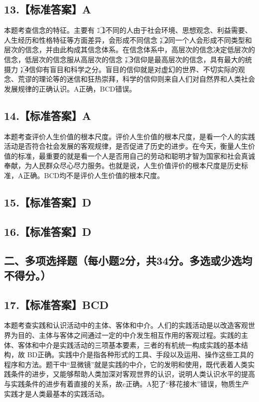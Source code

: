 \documentclass[UTF8,11pt]{ctexart}
\begin{document}
\subsection*{13.【标准答案】A}

本题考查信念的特征。主要有：\textcircled{1}不同的人由于社会环境、思想观念、利益需要、人生经历和性格特征等方面差异，会形成不同信念；\textcircled{2}同一个人会形成不同类型和层次的信念，并由此构成其信念体系。在信念体系中，高层次的信念决定低层次的信念，低层次的信念服从高层次的信念；\textcircled{3}信仰是最高层次的信念，具有最大的统摄力；\textcircled{4}信仰有盲目和科学之分。盲目的信仰就是对虚幻的世界、不切实际的观念、荒谬的理论等的迷信和狂热崇拜，科学的信仰则来自人们对自然界和人类社会发展规律的正确认识。A正确，BCD错误。


\subsection*{14.【标准答案】A}

本题考查评价人生价值的根本尺度。评价人生价值的根本尺度，是看一个人的实践活动是否符合社会发展的客观规律，是否促进了历史的进步。在今天，衡量人生价值的标准，最重要的就是看一个人是否用自己的劳动和聪明才智为国家和社会真诚奉献，为人民群众尽心尽力服务。也就是说，人生价值评价的根本尺度是历史标准，A正确。BCD均不是评价人生价值的根本尺度。


\subsection*{15.【标准答案】D}

\subsection*{16.【标准答案】D}

\subsection*{二、多项选择题（每小题2分，共34分。多选或少选均不得分。）}

\subsection*{17.【标准答案】BCD}

本题考查实践和认识活动中的主体、客体和中介。人们的实践活动是以改造客观世界为目的、主体与客体之间通过一定的中介发生相互作用的客观过程。实践的主体、客体和中介是实践活动的三项基本要素，三者的有机统一构成实践的基本结构，故 BD正确。实践中介是指各种形式的工具、手段以及运用、操作这些工具的程序和方法。题干中“显微镜”就是实践的中介，它的发明和使用，既代表着人类实践条件的进步，又能够帮助人类加深对客观世界的认识，说明人类认识水平的提高与实践条件的进步有着直接的关系，故c正确。A犯了“移花接木”错误，物质生产实践才是人类最基本的实践活动。
\end{document}
